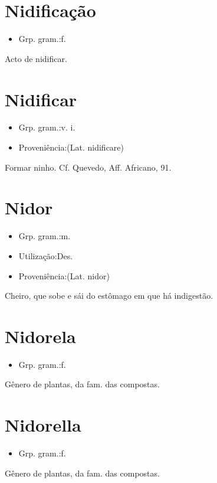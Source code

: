 \section{Nidificação}
\begin{itemize}
\item {Grp. gram.:f.}
\end{itemize}
Acto de \textunderscore nidificar\textunderscore .
\section{Nidificar}
\begin{itemize}
\item {Grp. gram.:v. i.}
\end{itemize}
\begin{itemize}
\item {Proveniência:(Lat. \textunderscore nidificare\textunderscore )}
\end{itemize}
Formar ninho. Cf. Quevedo, \textunderscore Aff. Africano\textunderscore , 91.
\section{Nidor}
\begin{itemize}
\item {Grp. gram.:m.}
\end{itemize}
\begin{itemize}
\item {Utilização:Des.}
\end{itemize}
\begin{itemize}
\item {Proveniência:(Lat. \textunderscore nidor\textunderscore )}
\end{itemize}
Cheiro, que sobe e sái do estômago em que há indigestão.
\section{Nidorela}
\begin{itemize}
\item {Grp. gram.:f.}
\end{itemize}
Gênero de plantas, da fam. das compostas.
\section{Nidorella}
\begin{itemize}
\item {Grp. gram.:f.}
\end{itemize}
Gênero de plantas, da fam. das compostas.
